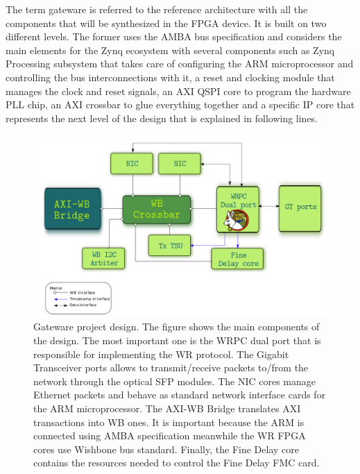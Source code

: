 The term gateware is referred to the reference architecture with all the components that will be synthesized in the FPGA device. It is built on two different levels. The former uses the AMBA bus specification and considers the main elements for the Zynq ecosystem with several components such as Zynq Processing subsystem that takes care of configuring the ARM microprocessor and controlling the bus interconnections with it, a reset and clocking module that manages the clock and reset signals, an AXI QSPI core to program the hardware PLL chip, an AXI crossbar to glue everything together and a specific IP core that represents the next level of the design that is explained in following lines.


\begin{figure}[H]
	\centering
	\includegraphics[scale=0.4]{img/gateware_first_level}
	\caption{Gateware project design. The figure shows the main components of the design. The most important one is the WRPC dual port that is responsible for implementing the WR protocol. The Gigabit Transceiver ports allows to transmit/receive packets to/from the network through the optical SFP modules. The NIC cores manage Ethernet packets and behave as standard network interface cards for the ARM microprocessor. The AXI-WB Bridge translates AXI transactions into WB ones. It is important because the ARM is connected using AMBA specification meanwhile the WR FPGA cores use Wishbone bus standard. Finally, the Fine Delay core contains the resources needed to control the Fine Delay FMC card.}
	\label{fig:gateware_first_level}
\end{figure}

